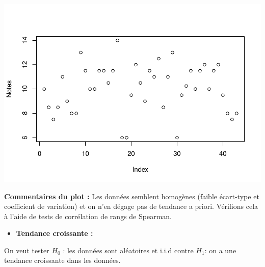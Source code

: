 \documentclass[
  12pt,
]{article}
\newenvironment{Shaded}{\begin{snugshade}}{\end{snugshade}}
\newcommand{\AttributeTok}[1]{\textcolor[rgb]{0.13,0.29,0.53}{#1}}
\newcommand{\CommentTok}[1]{\textcolor[rgb]{0.56,0.35,0.01}{\textit{#1}}}
\newcommand{\DecValTok}[1]{\textcolor[rgb]{0.00,0.00,0.81}{#1}}
\newcommand{\FunctionTok}[1]{\textcolor[rgb]{0.13,0.29,0.53}{\textbf{#1}}}
\newcommand{\NormalTok}[1]{#1}
\newcommand{\OtherTok}[1]{\textcolor[rgb]{0.56,0.35,0.01}{#1}}
\newcommand{\SpecialCharTok}[1]{\textcolor[rgb]{0.81,0.36,0.00}{\textbf{#1}}}
\newcommand{\StringTok}[1]{\textcolor[rgb]{0.31,0.60,0.02}{#1}}
\providecommand{\tightlist}{%
  \setlength{\itemsep}{0pt}\setlength{\parskip}{0pt}}
\begin{document}
\includegraphics{Stat_non_para_files/figure-latex/unnamed-chunk-15-1.pdf}

\textbf{Commentaires du plot :} Les données semblent homogènes (faible
écart-type et coefficient de variation) et on n'en dégage pas de
tendance a priori. Vérifions cela à l'aide de tests de corrélation de
rangs de Spearman.

\begin{itemize}
\tightlist
\item
  \textbf{Tendance croissante : }
\end{itemize}

On veut tester \(H_0\) : les données sont aléatoires et i.i.d contre
\(H_1\): on a une tendance croissante dans les données.

\begin{Shaded}
\end{Shaded}
\end{document}
